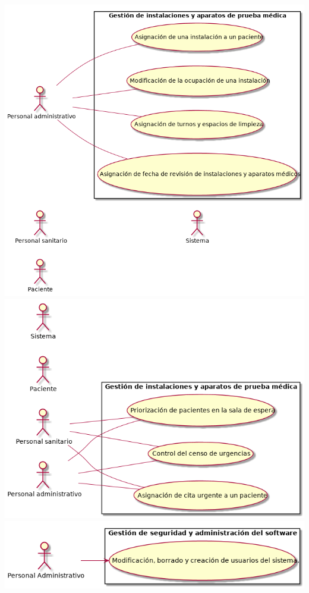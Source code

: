 \documentclass[10pt,a4paper,spanish]{report}
\begin{document}
\begin{center}
	\includegraphics[scale=0.4]{gestion-instalaciones-y-aparatos}\\
	\includegraphics[scale=0.4]{gestion-servicios-urgencia}\\
	\includegraphics[scale=0.5]{Gestion_de_seguridad_y_administracion_del_software}\\

\end{center}
\end{document}
